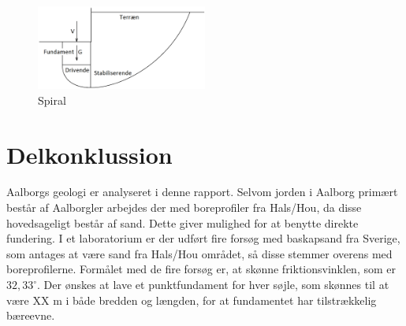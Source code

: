 \begin{figure}[htbp]
	\centering
	\includegraphics[width=0.5\textwidth]{billeder/spiral.png}
	\caption{Spiral}
	\label{fig:haha}
\end{figure}

\section{Delkonklussion}
Aalborgs geologi er analyseret i denne rapport. Selvom jorden i Aalborg primært består af Aalborgler arbejdes der med boreprofiler fra Hals/Hou, da disse hovedsageligt består af sand. Dette giver mulighed for at benytte direkte fundering. I et laboratorium er der udført fire forsøg med baskapsand fra Sverige, som antages at være sand fra Hals/Hou området, så disse stemmer overens med boreprofilerne. Formålet med de fire forsøg er, at skønne friktionsvinklen, som er $32,\!33^{\circ}$. Der ønskes at lave et punktfundament for hver søjle, som skønnes til at være XX m i både bredden og længden, for at fundamentet har tilstrækkelig bæreevne.